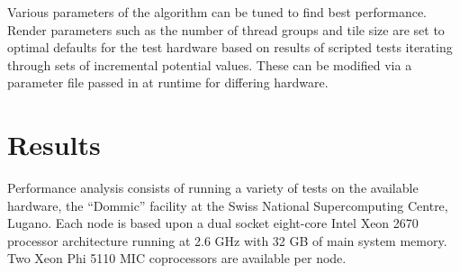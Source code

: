 \documentclass[runningheads,a4paper]{llncs}
\begin{document}

Various parameters of the algorithm can be tuned to find best performance. Render parameters such as the number of 
thread groups and tile size are set to optimal defaults for the test hardware based on results of scripted tests iterating 
through sets of incremental potential values. These can be modified via a parameter file passed in at runtime for differing 
hardware.



\section{Results}
\label{sect:results}

Performance analysis consists of running a variety of tests on the available hardware, the “Dommic” facility at the 
Swiss National Supercomputing Centre, Lugano. Each node is based upon a dual socket eight-core Intel Xeon 2670 
processor architecture running at 2.6 GHz with 32 GB of main system memory. Two Xeon Phi 5110 MIC coprocessors are 
available per node. 
\end{document}
